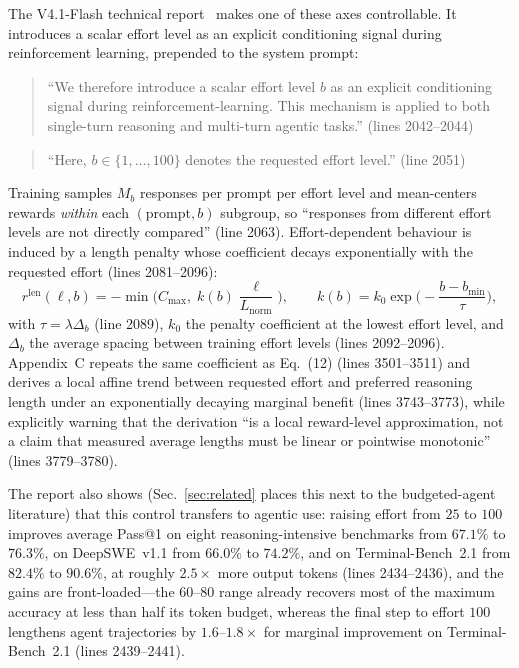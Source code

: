 \documentclass[10pt]{article} %
\newcommand{\eff}{b}
\begin{document}
The V4.1-Flash technical report~\citep{v41flash2026} makes one of these axes
controllable. It introduces a scalar effort level as an explicit conditioning
signal during reinforcement learning, prepended to the system prompt:
\begin{quote}
``We therefore introduce a scalar effort level $\eff$ as an explicit
conditioning signal during reinforcement-learning. This mechanism is applied to
both single-turn reasoning and multi-turn agentic tasks.'' (lines 2042--2044)
\end{quote}
\begin{quote}
``Here, $\eff \in \{1, \ldots, 100\}$ denotes the requested effort level.''
(line 2051)
\end{quote}
Training samples $M_b$ responses per prompt per effort level and mean-centers
rewards \emph{within} each $(\text{prompt}, \eff)$ subgroup, so ``responses from
different effort levels are not directly compared'' (line 2063). Effort-dependent
behaviour is induced by a length penalty whose coefficient decays exponentially
with the requested effort (lines 2081--2096):
\begin{equation}
r^{\mathrm{len}}(\ell, \eff) = -\min\!\Big( C_{\max},\; k(\eff)\frac{\ell}{L_{\mathrm{norm}}} \Big),
\qquad
k(\eff) = k_0 \exp\!\Big(-\frac{\eff - \eff_{\min}}{\tau}\Big),
\label{eq:k}
\end{equation}
with $\tau = \lambda\Delta_b$ (line 2089), $k_0$ the penalty coefficient at the
lowest effort level, and $\Delta_b$ the average spacing between training effort
levels (lines 2092--2096). Appendix~C repeats the same coefficient as Eq.~(12)
(lines 3501--3511) and derives a local affine trend between requested effort and
preferred reasoning length under an exponentially decaying marginal benefit
(lines 3743--3773), while explicitly warning that the derivation ``is a local
reward-level approximation, not a claim that measured average lengths must be
linear or pointwise monotonic'' (lines 3779--3780).

The report also shows (Sec.~\ref{sec:related} places this next to the budgeted-agent literature) that this control transfers to agentic use: raising effort
from $25$ to $100$ improves average Pass@1 on eight reasoning-intensive
benchmarks from $67.1\%$ to $76.3\%$, on DeepSWE~v1.1 from $66.0\%$ to $74.2\%$,
and on Terminal-Bench~2.1 from $82.4\%$ to $90.6\%$, at roughly $2.5\times$ more
output tokens (lines 2434--2436), and the gains are front-loaded---the $60$--$80$
range already recovers most of the maximum accuracy at less than half its token
budget, whereas the final step to effort $100$ lengthens agent trajectories by
$1.6$--$1.8\times$ for marginal improvement on Terminal-Bench~2.1
(lines 2439--2441).
\end{document}
